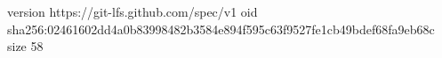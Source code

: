 version https://git-lfs.github.com/spec/v1
oid sha256:02461602dd4a0b83998482b3584e894f595c63f9527fe1cb49bdef68fa9eb68c
size 58
